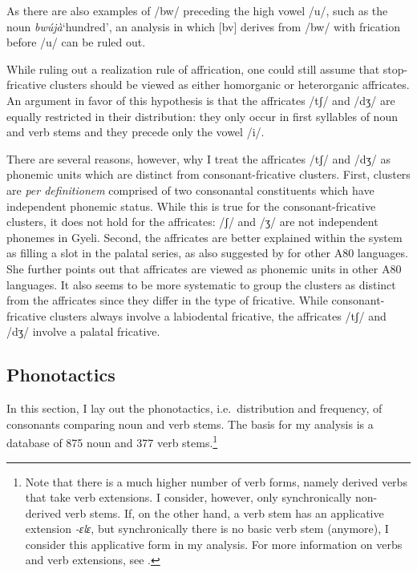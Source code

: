 \noindent As there are also examples of /bw/ preceding the high vowel /u/, such as the noun {\itshape bwújà}`hundred', an analysis in which [bv] derives from /bw/ with frication before /u/ can be ruled out.

While ruling out a realization rule of affrication, one could still assume that stop-fricative clusters should be viewed as either homorganic or heterorganic affricates. An argument in favor of this hypothesis is that the affricates /tʃ/ and /dʒ/ are equally restricted in their distribution: they only occur in first syllables of noun and verb stems and they precede only the vowel /i/.

There are several reasons, however, why I treat the affricates /tʃ/ and /dʒ/ as phonemic units which are distinct from consonant-fricative clusters. First, clusters are {\itshape per definitionem} comprised of two consonantal constituents which have independent phonemic status. While this is true for the consonant-fricative clusters, it does not hold for the affricates: /ʃ/ and /ʒ/ are not independent phonemes in Gyeli. Second, the affricates are better explained within the system as filling a slot in the palatal series, as also suggested by \citet[335]{cheucle2014} for other A80 languages. She further points out that affricates are viewed as phonemic units in other A80 languages. It also seems to be more systematic to group the clusters as distinct from the affricates since they differ in the type of fricative. While consonant-fricative clusters always involve a labiodental fricative, the affricates /tʃ/ and /dʒ/ involve a palatal fricative.









\subsection{Phonotactics}
\label{sec:Phonotact}


In this section, I lay out the phonotactics, i.e.\ distribution and frequency, of consonants comparing noun and verb stems. The basis for my analysis is a database of 875 noun and 377 verb stems.\footnote{Note that there is a much higher number of verb forms, namely derived verbs that take verb extensions. I consider, however, only synchronically non-derived verb stems. If, on the other hand, a verb stem has an applicative extension {\itshape -ɛlɛ}, but synchronically there is no basic verb stem (anymore), I consider this applicative form in my analysis. For more information on verbs and verb extensions, see .} 

